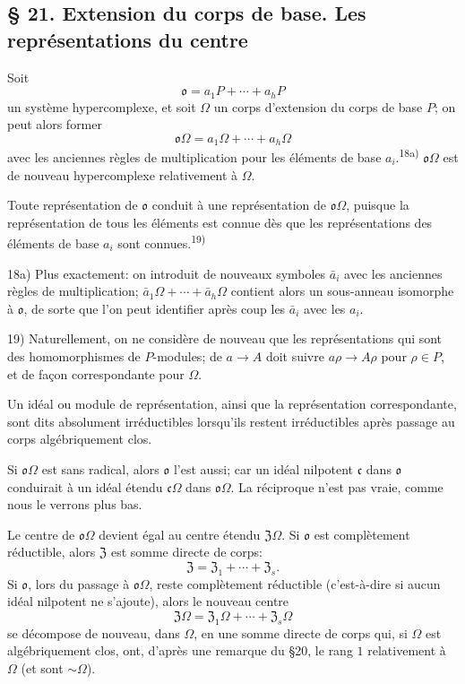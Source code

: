 
\providecommand{\mo}{\mathfrak{o}}
\providecommand{\mc}{\mathfrak{c}}
\providecommand{\mC}{\mathfrak{C}}
\providecommand{\ma}{\mathfrak{a}}
\providecommand{\mZ}{\mathfrak{Z}}

\subsection*{\S{} 21. Extension du corps de base. Les représentations du centre}
Soit
\[
        \mo=a_1P+\cdots+a_hP
\]
un système hypercomplexe, et soit $\Omega$ un corps d'extension du corps de base $P$; on peut alors former
\[
        \mo\Omega=a_1\Omega+\cdots+a_h\Omega
\]
avec les anciennes règles de multiplication pour les éléments de base $a_i$.\textsuperscript{18a)} $\mo\Omega$ est de nouveau hypercomplexe relativement à $\Omega$.

Toute représentation de $\mo$ conduit à une représentation de $\mo\Omega$, puisque la représentation de tous les éléments est connue dès que les représentations des éléments de base $a_i$ sont connues.\textsuperscript{19)}

{\footnotesize\noindent 18a) Plus exactement: on introduit de nouveaux symboles $\bar a_i$ avec les anciennes règles de multiplication; $\bar a_1\Omega+\cdots+\bar a_h\Omega$ contient alors un sous-anneau isomorphe à $\mo$, de sorte que l'on peut identifier après coup les $\bar a_i$ avec les $a_i$.\par
19) Naturellement, on ne considère de nouveau que les représentations qui sont des homomorphismes de $P$-modules; de $a\to A$ doit suivre $a\rho\to A\rho$ pour $\rho\in P$, et de façon correspondante pour $\Omega$.\par}

Un idéal ou module de représentation, ainsi que la représentation correspondante, sont dits absolument irréductibles lorsqu'ils restent irréductibles après passage au corps algébriquement clos.

Si $\mo\Omega$ est sans radical, alors $\mo$ l'est aussi; car un idéal nilpotent $\mc$ dans $\mo$ conduirait à un idéal étendu $\mc\Omega$ dans $\mo\Omega$. La réciproque n'est pas vraie, comme nous le verrons plus bas.

Le centre de $\mo\Omega$ devient égal au centre étendu $\mZ\Omega$. Si $\mo$ est complètement réductible, alors $\mZ$ est somme directe de corps:
\[
        \mZ=\mZ_1+\cdots+\mZ_s.
\]
Si $\mo$, lors du passage à $\mo\Omega$, reste complètement réductible (c'est-à-dire si aucun idéal nilpotent ne s'ajoute), alors le nouveau centre
\[
        \mZ\Omega=\mZ_1\Omega+\cdots+\mZ_s\Omega
\]
se décompose de nouveau, dans $\Omega$, en une somme directe de corps qui, si $\Omega$ est algébriquement clos, ont, d'après une remarque du \S{}20, le rang $1$ relativement à $\Omega$ (et sont $\sim\Omega$).

